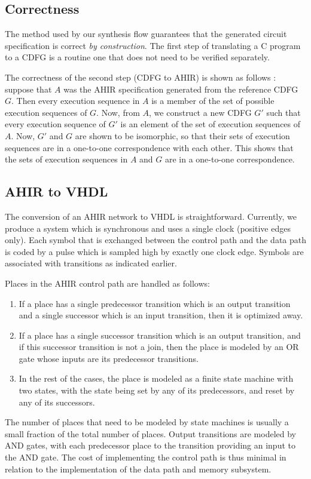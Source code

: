 \documentclass[conference]{IEEEtran}
\begin{document}
\subsection{Correctness}

The method used by our synthesis flow guarantees that the generated
circuit specification is correct {\em by construction}. The first step
of translating a C program to a CDFG is a routine one that does not
need to be verified separately. 

The correctness of the second step (CDFG to AHIR) is shown
as follows \cite{ahir_thesis}: suppose that
$A$ was the AHIR specification generated from the
reference CDFG $G$.  Then every execution sequence
in $A$ is a member of the set of
possible execution sequences of $G$.  Now,
from $A$, we construct a new CDFG $G'$ such
that every execution sequence of  $G'$  is
an element of the set of execution sequences
of $A$.  Now, $G'$ and $G$ are shown to be isomorphic,
so that their sets of execution sequences are in 
a one-to-one correspondence with each other.  This
shows that the sets of execution sequences in $A$ and
$G$ are in a one-to-one correspondence.

\subsection{AHIR to VHDL}

The conversion of an AHIR network to VHDL is straightforward.
Currently, we produce a system which is synchronous and uses
a single clock (positive edges only).  Each symbol that is
exchanged between the control path and the data path is coded 
by a pulse which is sampled high by exactly one clock
edge.  Symbols are associated with transitions as indicated
earlier.

Places in the AHIR control path are handled as follows:
\begin{enumerate}
\item If a place has a single predecessor transition which is
an output transition and a single successor which is an input
transition, then it is optimized away.
\item If a place has a single successor transition which is
an output transition, and if this successor transition is
not a join, then the place is modeled by an OR gate whose inputs
are its predecessor transitions.
\item In the rest of the cases, the place is modeled as 
a finite state machine with two states, with the state being
set by any of its predecessors, and reset by any of its successors.
\end{enumerate}
The number of places that need to be modeled by state machines is
usually a small fraction of the total number of places.
Output transitions are modeled by AND gates, with each predecessor place
to the transition providing an input to the AND gate.  The cost
of implementing the control path is thus minimal in relation to
the implementation of the data path and memory subsystem.
\end{document}
